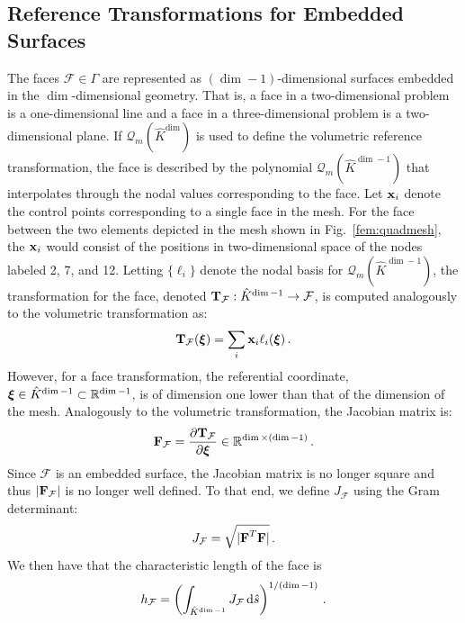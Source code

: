 \documentclass[../doc.tex]{subfiles}
\begin{document}
\subsection{Reference Transformations for Embedded Surfaces}
The faces $\mathcal{F} \in \Gamma$ are represented as $(\dim-1)$-dimensional surfaces embedded in the $\dim$-dimensional geometry. That is, a face in a two-dimensional problem is a one-dimensional line and a face in a three-dimensional problem is a two-dimensional plane. If $\mathcal{Q}_m(\hat{K}^{\dim})$ is used to define the volumetric reference transformation, the face is described by the polynomial $\mathcal{Q}_m(\hat{K}^{\dim-1})$ that interpolates through the nodal values corresponding to the face. 
Let $\boldsymbol{\mathrm{x}}_i$ denote the control points corresponding to a single face in the mesh. For the face between the two elements depicted in the mesh shown in Fig.~\ref{fem:quadmesh}, the $\boldsymbol{\mathrm{x}}_i$ would consist of the positions in two-dimensional space of the nodes labeled 2, 7, and 12. Letting $\{\ell_i\}$ denote the nodal basis for $\mathcal{Q}_m(\hat{K}^{\dim-1})$, the transformation for the face, denoted $\boldsymbol{\mathrm{T}}_\mathcal{F} : \hat{K}^{\dim-1} \rightarrow \mathcal{F}$, is computed analogously to the volumetric transformation as: 
	\begin{equation}
		\boldsymbol{\mathrm{T}}_\mathcal{F}(\boldsymbol{\xi}) = \sum_i \boldsymbol{\mathrm{x}}_i \ell_i(\boldsymbol{\xi}) \,. 
	\end{equation}
However, for a face transformation, the referential coordinate, $\boldsymbol{\xi} \in \hat{K}^{\dim-1} \subset \mathbb{R}^{\dim-1}$, is of dimension one lower than that of the dimension of the mesh. Analogously to the volumetric transformation, the Jacobian matrix is: 
	\begin{equation}
		\boldsymbol{\mathrm{F}}_\mathcal{F} = \frac{\partial \boldsymbol{\mathrm{T}}_\mathcal{F}}{\partial \boldsymbol{\xi}} \in \mathbb{R}^{\dim \times (\dim - 1)} \,. 
	\end{equation}
Since $\mathcal{F}$ is an embedded surface, the Jacobian matrix is no longer square and thus $|\boldsymbol{\mathrm{F}}_\mathcal{F}|$ is no longer well defined. To that end, we define $J_\mathcal{F}$ using the Gram determinant: 
	\begin{equation}
		J_\mathcal{F} = \sqrt{|\boldsymbol{\mathrm{F}}^T \boldsymbol{\mathrm{F}}|} \,. 
	\end{equation}
We then have that the characteristic length of the face is 
	\begin{equation}
		h_\mathcal{F} = \left( \int_{\hat{K}^{\dim-1}} J_\mathcal{F}\mathop{}\!\mathrm{d} \hat{s} \right)^{1/(\dim-1)} \,. 
	\end{equation}
\end{document}
